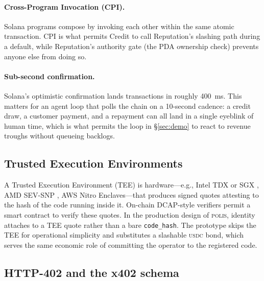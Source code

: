 \documentclass[10pt,conference,letterpaper]{IEEEtran}
\theoremstyle{definition}
\newcommand{\polis}{\textsc{polis}\xspace}
\newcommand{\codehash}{\texttt{code\_hash}}
\newcommand{\USDC}{\textsc{usdc}}
\begin{document}
\paragraph{Cross-Program Invocation (CPI).}
Solana programs compose by invoking each other within the same atomic
transaction. CPI is what permits Credit to call Reputation's slashing
path during a default, while Reputation's authority gate (the PDA
ownership check) prevents anyone else from doing so.

\paragraph{Sub-second confirmation.}
Solana's optimistic confirmation lands transactions in roughly 400~ms.
This matters for an agent loop that polls the chain on a 10-second
cadence: a credit draw, a customer payment, and a repayment can all
land in a single eyeblink of human time, which is what permits the
loop in \S\ref{sec:demo} to react to revenue troughs without queueing
backlogs.

\subsection{Trusted Execution Environments}

A Trusted Execution Environment (TEE) is hardware---e.g., Intel TDX or
SGX \cite{costan2016intel}, AMD SEV-SNP \cite{kaplan2016amd}, AWS Nitro
Enclaves---that produces signed quotes attesting to the hash of the
code running inside it. On-chain DCAP-style verifiers
\cite{dcap2024onchain} permit a smart contract to verify these quotes.
In the production design of \polis, identity attaches to a TEE quote
rather than a bare \codehash. The prototype skips the TEE for
operational simplicity and substitutes a slashable \USDC{} bond, which
serves the same economic role of committing the operator to the
registered code.

\subsection{HTTP-402 and the x402 schema}
\end{document}
